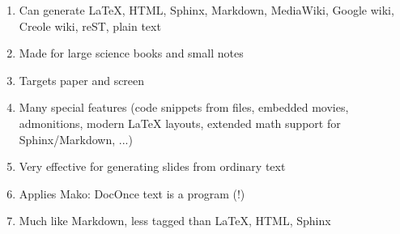 \documentclass[%
oneside,                 %
final,                   %
10pt]{article}
\begin{document}
\begin{enumerate}
\item Can generate {\LaTeX}, HTML, Sphinx, Markdown, MediaWiki, Google wiki, Creole wiki, reST, plain text

\item Made for large science books and small notes

\item Targets paper and screen

\item Many special features (code snippets from files, embedded movies, admonitions, modern {\LaTeX} layouts, extended math support for Sphinx/Markdown, ...)

\item Very effective for generating slides from ordinary text

\item Applies Mako: DocOnce text is a program (!)

\item Much like Markdown, less tagged than {\LaTeX}, HTML, Sphinx
\end{enumerate}

\noindent
























\end{document}
